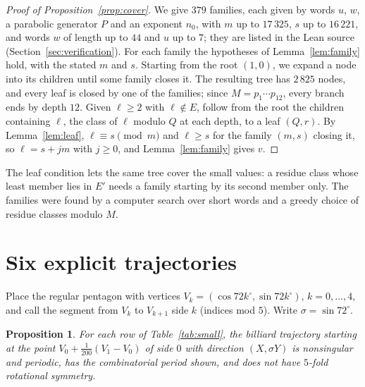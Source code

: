 \documentclass[11pt]{article}
\newtheorem{proposition}[theorem]{Proposition}
\theoremstyle{definition}
\theoremstyle{remark}
\begin{document}
\begin{proof}[Proof of Proposition~\ref{prop:cover}]
We give $379$ families, each given by words $u$, $w$, a parabolic
generator $P$ and an exponent $n_0$,
with $m$ up to $17\,325$, $s$ up to $16\,221$, and words $w$ of length up to $44$
and $u$ up to $7$; they are listed in the Lean source
(Section~\ref{sec:verification}). For each family the hypotheses of
Lemma~\ref{lem:family} hold, with the stated $m$ and $s$. Starting from the
root $(1,0)$, we expand a node into its children until some family closes
it. The resulting tree has $2\,825$ nodes, and every leaf is closed by one of
the families; since $M=p_1\cdots p_{12}$, every branch ends by depth $12$.
Given $\ell\ge2$ with $\ell\notin E$, follow from the root the children
containing $\ell$, the class of $\ell$ modulo $Q$ at each depth, to a leaf
$(Q,r)$. By Lemma~\ref{lem:leaf}, $\ell\equiv s\pmod m$ and $\ell\ge s$ for
the family $(m,s)$ closing it, so $\ell=s+jm$ with $j\ge0$, and
Lemma~\ref{lem:family} gives $v$.
\end{proof}

The leaf condition lets the same tree cover the small values: a residue
class whose least member lies in $E'$ needs a family starting by its second
member only. The families were found by a computer search over short words
and a greedy choice of residue classes modulo $M$.

\section{Six explicit trajectories}\label{sec:small}

Place the regular pentagon with vertices $V_k=(\cos72k^\circ,\sin72k^\circ)$,
$k=0,\dots,4$, and call the segment from $V_k$ to $V_{k+1}$ side $k$
(indices mod $5$). Write $\sigma=\sin72^\circ$.

\begin{proposition}\label{prop:small}
For each row of Table~\ref{tab:small}, the billiard trajectory starting at
the point $V_0+\tfrac1{200}(V_1-V_0)$ of side $0$ with direction
$(X,\sigma Y)$ is nonsingular and periodic, has the combinatorial period
shown, and does not have $5$-fold rotational symmetry.
\end{proposition}
\end{document}
